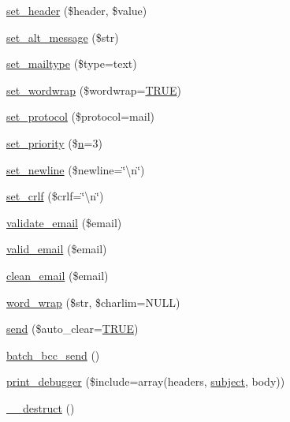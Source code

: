 \begin{DoxyCompactItemize}
\item 
\mbox{\hyperlink{class_c_i___email_aff40701d50f18c87942be79f8b447247}{set\+\_\+header}} (\$header, \$value)
\item 
\mbox{\hyperlink{class_c_i___email_a18f0b650e6e9a859e1936a41e86fb3a6}{set\+\_\+alt\+\_\+message}} (\$str)
\item 
\mbox{\hyperlink{class_c_i___email_a9baeadff990ea673d75c3019c8cc3524}{set\+\_\+mailtype}} (\$type=\textquotesingle{}text\textquotesingle{})
\item 
\mbox{\hyperlink{class_c_i___email_a6abb8d5f17213eba1e243ca633da8084}{set\+\_\+wordwrap}} (\$wordwrap=\mbox{\hyperlink{constants_8php_ae04a3efe6aa42044f803ee90c2277846}{T\+R\+UE}})
\item 
\mbox{\hyperlink{class_c_i___email_a7be40507898a21ce9172b225e973b107}{set\+\_\+protocol}} (\$protocol=\textquotesingle{}mail\textquotesingle{})
\item 
\mbox{\hyperlink{class_c_i___email_aee3ae37c0bf5f8aca34f6e872efd66b8}{set\+\_\+priority}} (\$\mbox{\hyperlink{cli_2error__php_8php_a2e6b16bbc42094e4c51ade3c10afdcf1}{n}}=3)
\item 
\mbox{\hyperlink{class_c_i___email_a095be9606f6f063ee6e1af81b53d405e}{set\+\_\+newline}} (\$newline=\char`\"{}\textbackslash{}n\char`\"{})
\item 
\mbox{\hyperlink{class_c_i___email_a8bfdf8b14a9dcf4ee18b52c0a2afa833}{set\+\_\+crlf}} (\$crlf=\char`\"{}\textbackslash{}n\char`\"{})
\item 
\mbox{\hyperlink{class_c_i___email_a1907f0dba44e2968b8260dbc5770550f}{validate\+\_\+email}} (\$email)
\item 
\mbox{\hyperlink{class_c_i___email_abe07a23d74d453da8fb639b5c3951873}{valid\+\_\+email}} (\$email)
\item 
\mbox{\hyperlink{class_c_i___email_ab8139994bc1b1bee3d2750b627cdd0c6}{clean\+\_\+email}} (\$email)
\item 
\mbox{\hyperlink{class_c_i___email_aa3a2a5440115b320a0c2fcea542e546a}{word\+\_\+wrap}} (\$str, \$charlim=N\+U\+LL)
\item 
\mbox{\hyperlink{class_c_i___email_a547a65a81ba2d1f98cc15121a45dab11}{send}} (\$auto\+\_\+clear=\mbox{\hyperlink{constants_8php_ae04a3efe6aa42044f803ee90c2277846}{T\+R\+UE}})
\item 
\mbox{\hyperlink{class_c_i___email_a889f14cabfcfe05b5c0d0dbbb8f557e0}{batch\+\_\+bcc\+\_\+send}} ()
\item 
\mbox{\hyperlink{class_c_i___email_a11f22e40cb1409ee7569c0abc15fae09}{print\+\_\+debugger}} (\$include=array(\textquotesingle{}headers\textquotesingle{}, \textquotesingle{}\mbox{\hyperlink{class_c_i___email_aaa61b3aaa6cc4c90e26686e4bf41587a}{subject}}\textquotesingle{}, \textquotesingle{}body\textquotesingle{}))
\item 
\mbox{\hyperlink{class_c_i___email_a421831a265621325e1fdd19aace0c758}{\+\_\+\+\_\+destruct}} ()
\end{DoxyCompactItemize}
